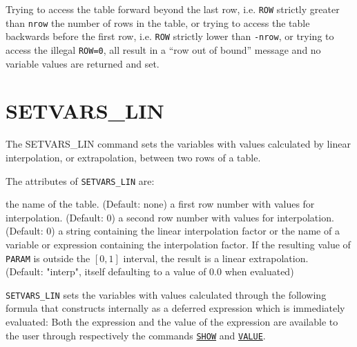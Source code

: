 
Trying to access the table forward beyond the last row, i.e. \texttt{ROW}
strictly greater than {\tt nrow} the number of rows in the table, or
trying to access the table backwards before the first row, i.e. \texttt{ROW}
strictly lower than {\tt -nrow}, or trying to access the illegal
\texttt{ROW=0}, all result in a ``row out of bound'' message and no
variable values are returned and set.  



\section{SETVARS\_LIN}
\label{sec:setvars_lin}

The SETVARS\_LIN command sets the variables with values calculated
by linear interpolation, or extrapolation, between two rows of a table. 


The attributes of \texttt{SETVARS\_LIN} are:
\begin{madlist}
   the name of the table. (Default: none)
   a first row number with values for interpolation. (Default: 0)
   a second row number with values for interpolation. (Default: 0)
   a string containing the linear interpolation factor or
  the name of a variable or expression containing the interpolation
  factor. If the resulting value of \texttt{PARAM} is outside the
  $[0,1]$ interval, the result is a linear extrapolation. \\
  (Default: "interp", itself defaulting to a value of 0.0 when evaluated)
\end{madlist}

\texttt{SETVARS\_LIN} sets the variables with values calculated through
the following formula that \madx constructs internally as a deferred
expression which is immediately evaluated:
Both the expression and the value of the expression are available to the
user through respectively the commands \hyperref[sec:show]{\tt SHOW} 
and \hyperref[sec:value]{\tt VALUE}.


